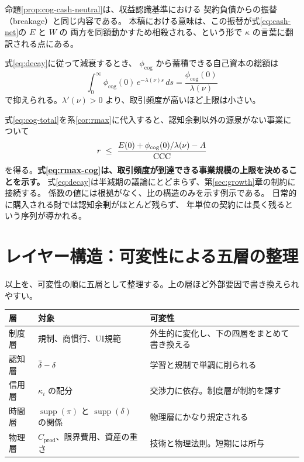 \begin{example}[頻度と半減期]
\begin{remark}[会計上の扱いと一致する]
命題\ref{prop:cog-cash-neutral}は、収益認識基準における
契約負債からの振替（breakage）と同じ内容である。
本稿における意味は、この振替が式\eqref{eq:cash-net}の $E$ と $W$ の
両方を同額動かすため相殺される、という形で $\kappa$ の言葉に翻訳される点にある。
\end{remark}

\begin{corollary}[認知余剰から積める自己資本には上限がある]
\label{cor:cog-bounded}
式\eqref{eq:decay}に従って減衰するとき、
$\phi_{\mathrm{cog}}$ から蓄積できる自己資本の総額は
\begin{equation}
\int_0^{\infty}\phi_{\mathrm{cog}}(0)\,e^{-\lambda(\nu)s}\,ds
= \frac{\phi_{\mathrm{cog}}(0)}{\lambda(\nu)}
\label{eq:cog-total}
\end{equation}
で抑えられる。$\lambda'(\nu)>0$ より、取引頻度が高いほど上限は小さい。
\end{corollary}

式\eqref{eq:cog-total}を系\ref{cor:rmax}に代入すると、認知余剰以外の源泉がない事業について
\begin{equation}
r \ \leq\ \frac{E(0) + \phi_{\mathrm{cog}}(0)/\lambda(\nu) - A}{\mathrm{CCC}}
\label{eq:rmax-cog}
\end{equation}
を得る。\textbf{式\eqref{eq:rmax-cog}は、取引頻度が到達できる事業規模の上限を決めることを示す。}
式\eqref{eq:decay}は半減期の議論にとどまらず、第\ref{sec:growth}章の制約に接続する。
係数の値には根拠がなく、比の構造のみを示す例示である。
日常的に購入される財では認知余剰がほとんど残らず、
年単位の契約には長く残るという序列が導かれる。
\end{example}

\section{レイヤー構造：可変性による五層の整理}
\label{sec:layers}

以上を、可変性の順に五層として整理する。上の層ほど外部要因で書き換えられやすい。

\begin{center}
\begin{tabularx}{\textwidth}{@{}llX@{}}
\toprule
層 & 対象 & 可変性 \\
\midrule
制度層 & 規制、商慣行、UI規範 & 外生的に変化し、下の四層をまとめて書き換える \\
認知層 & $\dbar-\delta$ & 学習と規制で単調に削られる \\
信用層 & $\kappa_i$ の配分 & 交渉力に依存。制度層が制約を課す \\
時間層 & $\operatorname{supp}(\pi)$ と $\operatorname{supp}(\delta)$ の関係 & 物理層にかなり規定される \\
物理層 & $C_{\mathrm{prod}}$、限界費用、資産の重さ & 技術と物理法則。短期には所与 \\
\bottomrule
\end{tabularx}
\label{tab:five-layers}
\end{center}

